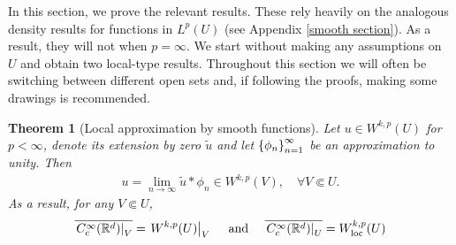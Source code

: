\documentclass[12pt]{article}
\newtheorem{theorem}{Theorem}
\theoremstyle{remark}
\newcommand\restr[2]{\left.#1\right|_{#2}}
\begin{document}
In this section, we prove the relevant results. These rely heavily on the analogous density results for functions in $L^p(U)$ (see Appendix \ref{smooth section}). As a result, they will not when $p=\infty$. We start without making any assumptions on $U$ and obtain two local-type results. Throughout this section we will often be switching between different open sets and, if following the proofs, making some drawings is recommended.
\begin{theorem}[Local approximation by smooth functions]\label{local} Let  $u \in W^{k,p}(U)$ for $p < \infty$, denote its extension by zero $\tilde{u}$  and let $\left\{\phi_n\right\}_{n=1}^\infty $ be an approximation to unity. Then
	\begin{align*}
		u=\lim_{n \to \infty} \tilde{u}*\phi_n  \in W^{k,p}(V) , \quad\forall V \Subset U.
	\end{align*}
	As a result, for any $V \Subset U$,
	\begin{align*}
		\overline{\restr{C_c^\infty(\R^d)}{V}}=\restr{W^{k,p}(U)}{V}\quad \text{ and } \quad \overline{\restr{C_c^\infty(\R^d)}{U}}=W_{\mathrm{loc}}^{k,p}(U)
	\end{align*}

\end{theorem}
\end{document}
